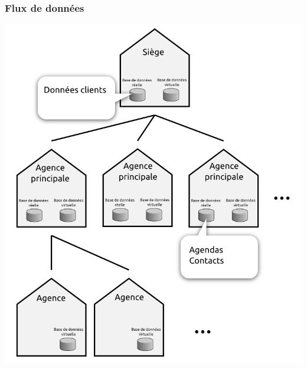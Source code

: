 \documentclass[a4paper]{article}
\begin{document}
\subsubsection{ Flux de données }


\includegraphics[width=\linewidth]{Includes/arch_hierarchie.png}
\end{document}

